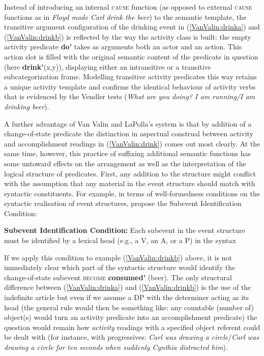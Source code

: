 Instead of introducing an internal \textsc{cause} function (as opposed to external \textsc{cause} functions as in \textit{Floyd made Carl drink the beer}) to the semantic template, the transitive argument configuration of the drinking event in (\ref{VanValin:drinka}) and (\ref{VanValin:drinkb}) is reflected by the way the activity class is built: the empty activity predicate \textbf{do'} takes as arguments both an actor and an action. This action slot is filled with the original semantic content of the predicate in question (here \textbf{drink'}(x,y)), displaying either an intransitive or a transitive subcategorization frame. Modelling transitive activity predicates this way retains a unique activity template and confirms the identical behaviour of activity verbs that is evidenced by the Vendler tests (\textit{What are you doing? I am running/I am drinking beer}). 

A further advantage of Van Valin and LaPolla's system is that by addition of a change-of-state predicate the distinction in aspectual construal between activity and accomplishment readings in (\ref{VanValin:drink}) comes out most clearly. At the same time, however, this practice of suffixing additional semantic functions has some untoward effects on the arrangement as well as the interpretation of the logical structure of predicates. First, any addition to the structure might conflict with the assumption that any material in the event structure should match with syntactic constituents. For example, in terms of well-formedness conditions on the syntactic realisation of event structures, \citet[112]{rappaport1998building} propose the Subevent Identification Condition:
 
\ea \textbf{Subevent Identification Condition:} Each subevent in the event structure must be identified by a lexical head (e.g., a V, an A, or a P) in the syntax 
\z

If we apply this condition to example (\ref{VanValin:drinkb}) above, it is not immediately clear which part of the syntactic structure would identify the change-of-state subevent \textsc{become} \textbf{consumed'} (beer). The only structural difference between (\ref{VanValin:drinka}) and (\ref{VanValin:drinkb}) is the use of the indefinite article but even if we assume a DP with the determiner acting as its head (the general rule would then be something like: any countable (number of) object(s) would turn an activity predicate into an accomplishment predicate) the question would remain how \emph{activity} readings with a specified object referent could be dealt with (for instance, with progressives: \textit{Carl was drawing a circle}/\textit{Carl was drawing a circle for ten seconds when suddenly Cynthia distracted him}). 

